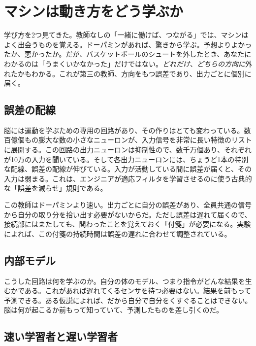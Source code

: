 \chapter{マシンは動き方をどう学ぶか}

学び方を2つ見てきた。教師なしの「一緒に働けば、つながる」では、マシンはよく出会うものを覚える。ドーパミンがあれば、驚きから学ぶ。予想よりよかったか、悪かったか。だが、バスケットボールのシュートを外したとき、あなたにわかるのは「うまくいかなかった」だけではない。\emph{どれだけ}、\emph{どちらの方向に}外れたかもわかる。これが第三の教師、方向をもつ誤差であり、出力ごとに個別に届く。

\section*{誤差の配線}

脳には運動を学ぶための専用の回路があり、その作りはとても変わっている。数百億個もの膨大な数の小さなニューロンが、入力信号を非常に長い特徴のリストに展開する。この回路の出力ニューロンは抑制性ので、数千万個あり、それぞれが10万の入力を聞いている。そして各出力ニューロンには、ちょうど1本の特別な配線、誤差の配線が伸びている。入力が活動している間に誤差が届くと、その入力は弱まる。これは、エンジニアが適応フィルタを学習させるのに使う古典的な「誤差を減らせ」規則である。


この教師はドーパミンより速い。出力ごとに自分の誤差があり、全員共通の信号から自分の取り分を拾い出す必要がないからだ。ただし誤差は遅れて届くので、接続部にはまたしても、関わったことを覚えておく「付箋」が必要になる。実験によれば、この付箋の持続時間は誤差の遅れに合わせて調整されている。

\section*{内部モデル}

こうした回路は何を学ぶのか。自分の体のモデル、つまり指令がどんな結果を生むかである。これがあれば遅れてくるセンサを待つ必要はない。結果を前もって予測できる。ある仮説によれば、だから自分で自分をくすぐることはできない。脳は何が起こるか前もって知っていて、予測したものを差し引くのだ。

\section*{速い学習者と遅い学習者}

